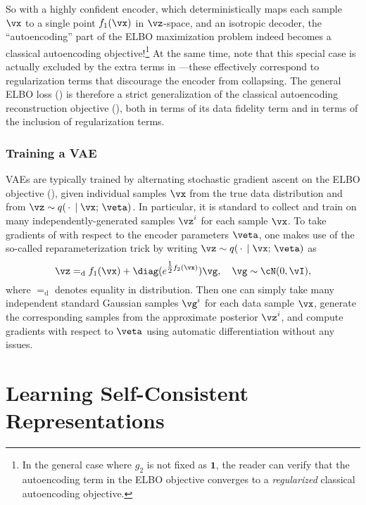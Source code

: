 \documentclass[../../book-main.tex]{subfiles}
\begin{document}
So with a highly confident encoder, which deterministically maps each sample
$\vx$ to a single point $f_1(\vx)$ in $\vz$-space, and an isotropic decoder,
the ``autoencoding'' part of the ELBO maximization problem indeed becomes
a classical autoencoding objective!\footnote{In the general case where $g_2$ is
not fixed as $\mathbf{1}$, the reader can verify that the autoencoding term in
the ELBO objective converges to a \textit{regularized} classical autoencoding
objective.}
At the same time, note that this special case is actually excluded by the
extra terms in ---these effectively correspond to
regularization terms that discourage the encoder from collapsing.
The general ELBO loss () is
therefore a strict generalization of the classical autoencoding reconstruction
objective (), both in terms of its data fidelity term
and in terms of the inclusion of regularization terms.

\subsubsection{Training a VAE}
VAEs are typically trained by alternating stochastic gradient ascent on the ELBO
objective (), given individual samples
$\vx$ from the
true data distribution and from $\vz \sim q(\,\cdot\,\mid \vx;\, \veta)$. In
particular, it is standard to collect and train on many independently-generated
samples $\vz^{i}$ for each sample $\vx$. To take gradients of
 with respect to the encoder parameters $\veta$,
one makes use of the so-called reparameterization trick by writing $\vz \sim
q(\,\cdot\,\mid \vx;\, \veta)$ as
\begin{equation*}
\vz =_{\mathrm{d}} f_1(\vx) + \diag(e^{\tfrac{1}{2}f_2(\vx)}) \vg,
\quad \vg \sim
\cN(0, \vI),
\end{equation*}
where $=_{\mathrm{d}}$ denotes equality in distribution. Then one can simply
take many independent standard Gaussian samples $\vg^{i}$ for each data sample
$\vx$, generate the corresponding samples from the approximate posterior
$\vz^i$, and compute gradients with respect to $\veta$ using automatic
differentiation without any issues.



\section{Learning Self-Consistent Representations}
\label{sec:self-consistency}
\end{document}
